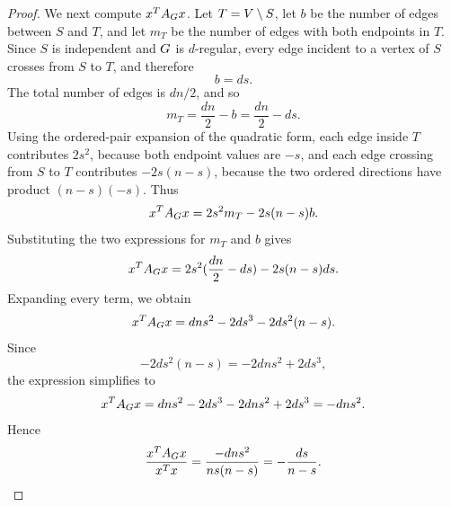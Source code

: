 \begin{proof}
	We next compute \(x^TA_{G}x\). Let \(T=V\setminus S\), let \(b\) be the number of edges between \(S\) and \(T\), and let \(m_T\) be the number of edges with both endpoints in \(T\). Since \(S\) is independent and \(G\) is \(d\)-regular, every edge incident to a vertex of \(S\) crosses from \(S\) to \(T\), and therefore
	\begin{equation}
		b=ds.
	\end{equation}
	The total number of edges is \(dn/2\), and so
	\begin{equation}
		m_T=\frac{dn}{2}-b=\frac{dn}{2}-ds.
	\end{equation}
	Using the ordered-pair expansion of the quadratic form, each edge inside \(T\) contributes \(2s^2\), because both endpoint values are \(-s\), and each edge crossing from \(S\) to \(T\) contributes \(-2s(n-s)\), because the two ordered directions have product \((n-s)(-s)\). Thus
	\begin{equation}
		x^TA_{G}x=2s^2m_T-2s(n-s)b.
	\end{equation}
	Substituting the two expressions for \(m_T\) and \(b\) gives
	\begin{equation}
		x^TA_{G}x
		=
		2s^2(\frac{dn}{2}-ds)-2s(n-s)ds.
	\end{equation}
	Expanding every term, we obtain
	\begin{equation}
		x^TA_{G}x
		=
		dns^2-2ds^3-2ds^2(n-s).
	\end{equation}
	Since
	\begin{equation}
		-2ds^2(n-s)=-2dns^2+2ds^3,
	\end{equation}
	the expression simplifies to
	\begin{equation}
		x^TA_{G}x=dns^2-2ds^3-2dns^2+2ds^3=-dns^2.
	\end{equation}
	Hence
	\begin{equation}
		\frac{x^TA_{G}x}{x^T x}
		=
		\frac{-dns^2}{ns(n-s)}
		=
		-\frac{ds}{n-s}.
	\end{equation}


\end{proof}
